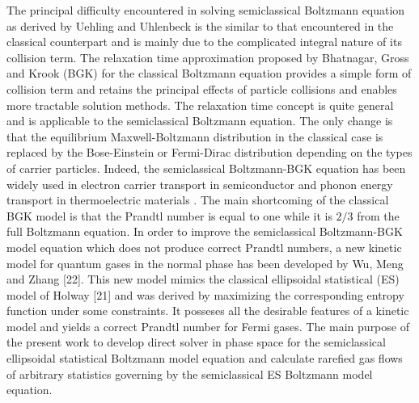 \documentclass{rsproca}%
\begin{document}
The principal difficulty encountered in solving semiclassical Boltzmann equation as derived by Uehling and Uhlenbeck is the similar to that encountered in the classical counterpart and is mainly due to the complicated integral nature of its collision term. The relaxation time approximation proposed by Bhatnagar, Gross and Krook (BGK) \cite{PhysRev.94.511} for the classical Boltzmann equation provides a simple form of collision term and retains the principal effects of particle collisions and enables more tractable solution methods.  The relaxation time concept is quite general and is applicable to the semiclassical Boltzmann equation.   The only change is that the equilibrium Maxwell-Boltzmann distribution in the classical case is replaced by the Bose-Einstein or Fermi-Dirac distribution depending on the types of carrier particles.  Indeed, the semiclassical Boltzmann-BGK equation has been widely used in electron carrier transport in semiconductor \cite{Lundstrom:2000,Fatemi1993209,Carrillo2003498,Majorana2002450,springerlink:10.1023/A:1020751624960,springerlink:10.1023/B:JCEL.0000011455.74817.35,Markowich2002,Pattamatta2009,Scaldaferri2007} and phonon energy transport in thermoelectric materials \cite{GChen2005}.   The main shortcoming of the classical BGK model is that the Prandtl number is equal to one while it is $2/3$ from the full Boltzmann equation.  In order to improve the semiclassical Boltzmann-BGK model equation which does not produce correct Prandtl numbers, a new kinetic model for quantum gases in the normal phase has been developed by Wu, Meng and Zhang [22]. This new model mimics the classical ellipsoidal statistical (ES) model of Holway [21] and was derived by maximizing the corresponding entropy function under some constraints.   It posseses all the desirable features of a kinetic model and yields a correct Prandtl number for Fermi gases.   The main purpose of the present work to develop direct solver in phase space for the semiclassical ellipsoidal statistical Boltzmann model equation and calculate rarefied gas flows of arbitrary statistics governing by the semiclassical ES Boltzmann model equation.
\end{document}
